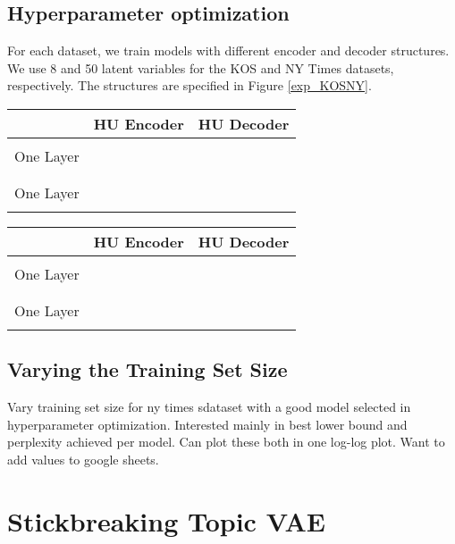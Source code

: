\documentclass{report}
\begin{document}
	\subsection{Hyperparameter optimization}
	For each dataset, we train models with different encoder and decoder structures. We use 8 and 50 latent variables for the KOS and NY Times datasets, respectively. The structures are specified in Figure \ref{exp_KOSNY}.  
	
	
	\begin{tabular}{l||l|l|}\label{exp_KOSNY}
						& HU Encoder & HU Decoder   	\\
		\hline
						& 			& 			\\
		\cline{2-3} 
		One Layer 		& 			& 			\\
		\cline{2-3}
						& 			& 			\\
		\hline	
						& 			&  			\\
		\cline{2-3} 
		One Layer 		& 			& 			\\
		\cline{2-3}
						& 			& 			\\
		\hline
	\end{tabular}
	
	
	\begin{tabular}{l||l|l|}\label{exp_NY}
		& HU Encoder & HU Decoder   	\\
		\hline
		& 			& 			\\
		\cline{2-3} 
		One Layer 		& 			& 			\\
		\cline{2-3}
		& 			& 			\\
		\hline	
		& 			&  			\\
		\cline{2-3} 
		One Layer 		& 			& 			\\
		\cline{2-3}
		& 			& 			\\
		\hline
	\end{tabular}
	
	\subsection{Varying the Training Set Size}
	Vary training set size for ny times sdataset with a good model selected in hyperparameter optimization. Interested mainly in best lower bound and perplexity achieved per model. Can plot these both in one log-log plot. Want to add values to google sheets.
		
	\section{Stickbreaking Topic VAE}
	
\end{document}

